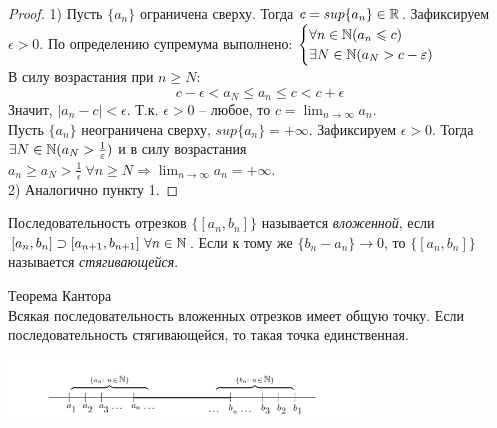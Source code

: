     \begin{proof}
        1) Пусть $\{a_{n}\}$ ограничена сверху. Тогда $c = sup\{a_{n}\} \in \mathbb{R}$. Зафиксируем $\epsilon > 0$. По определению супремума выполнено:
        $\begin{cases}
            \forall n \in \mathbb{N} (a_{n} \leqslant c)
            \\
            \exists N \in \mathbb{N} (a_{N} > c - \varepsilon)
        \end{cases}$
        \\
        В силу возрастания при $n \geq N$:
        \[c - \epsilon < a_{N} \leq a_{n} \leq c < c + \epsilon\]
        Значит, $|a_{n} - c| < \epsilon$. Т.к. $\epsilon > 0$ -- любое, то $c = \lim_{n \to \infty} a_{n}$.
        \\
        Пусть $\{a_{n}\}$ неограничена сверху, $sup\{a_{n}\} = + \infty$. Зафиксируем $\epsilon > 0$. Тогда $\exists N \in \mathbb{N} (a_{N} > \frac{1}{\varepsilon})$ и в силу возрастания $a_{n} \geq a_{N} > \frac{1}{\epsilon} \ \forall n \geq N \Rightarrow \lim_{n \to \infty} a_{n} = + \infty$.
        \\
        2) Аналогично пункту 1.
    \end{proof}

    \begin{definition}
        Последовательность отрезков $\{[a_{n}, b_{n}]\}$ называется \textit{вложенной}, если $[a_{n}, b_{n}] \supset [a_{n+1}, b_{n+1}] \ \forall n \in \mathbb{N}$.
        Если к тому же $\{b_{n}-a_{n}\} \to 0$, то $\{[a_{n}, b_{n}]\}$ называется \textit{стягивающейся}.
    \end{definition}

    \begin{theorem}{Теорема Кантора}\\
        Всякая последовательность вложенных отрезков имеет общую точку. Если последовательность стягивающейся, то такая точка единственная.
    \end{theorem}
    
    \begin{center}
        \includegraphics[width=0.7\textwidth]{colloq2.png}
    \end{center}

